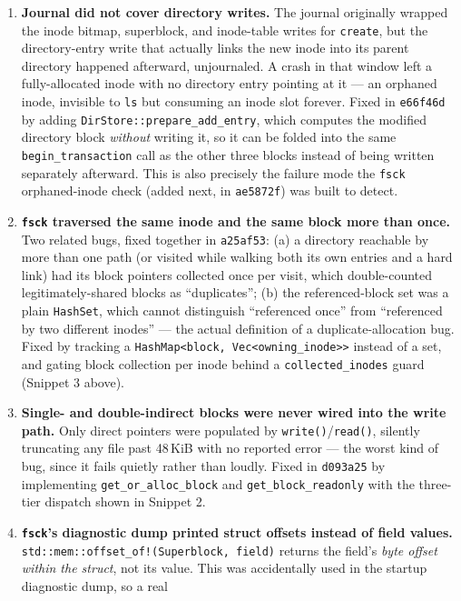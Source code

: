 \documentclass[11pt]{article}
\begin{document}
\begin{enumerate}
    \item \textbf{Journal did not cover directory writes.} The journal originally wrapped the inode
    bitmap, superblock, and inode-table writes for \texttt{create}, but the directory-entry write that
    actually links the new inode into its parent directory happened afterward, unjournaled. A crash in
    that window left a fully-allocated inode with no directory entry pointing at it — an orphaned inode,
    invisible to \texttt{ls} but consuming an inode slot forever. Fixed in \texttt{e66f46d} by adding
    \texttt{DirStore::prepare\_add\_entry}, which computes the modified directory block \emph{without}
    writing it, so it can be folded into the same \texttt{begin\_transaction} call as the other three
    blocks instead of being written separately afterward. This is also precisely the failure mode the
    \texttt{fsck} orphaned-inode check (added next, in \texttt{ae5872f}) was built to detect.
    \item \textbf{\texttt{fsck} traversed the same inode and the same block more than once.} Two related
    bugs, fixed together in \texttt{a25af53}: (a) a directory reachable by more than one path (or visited
    while walking both its own entries and a hard link) had its block pointers collected once per visit,
    which double-counted legitimately-shared blocks as ``duplicates''; (b) the referenced-block set was a
    plain \texttt{HashSet}, which cannot distinguish ``referenced once'' from ``referenced by two different
    inodes'' — the actual definition of a duplicate-allocation bug. Fixed by tracking a
    \texttt{HashMap<block, Vec<owning\_inode>>} instead of a set, and gating block collection per inode
    behind a \texttt{collected\_inodes} guard (Snippet 3 above).
    \item \textbf{Single- and double-indirect blocks were never wired into the write path.} Only direct
    pointers were populated by \texttt{write()}/\texttt{read()}, silently truncating any file past
    48\,KiB with no reported error — the worst kind of bug, since it fails quietly rather than loudly.
    Fixed in \texttt{d093a25} by implementing \texttt{get\_or\_alloc\_block} and
    \texttt{get\_block\_readonly} with the three-tier dispatch shown in Snippet 2.
    \item \textbf{\texttt{fsck}'s diagnostic dump printed struct offsets instead of field values.}
    \texttt{std::mem::offset\_of!(Superblock, field)} returns the field's \emph{byte offset within the
    struct}, not its value. This was accidentally used in the startup diagnostic dump, so a real

\end{enumerate}
\end{document}
